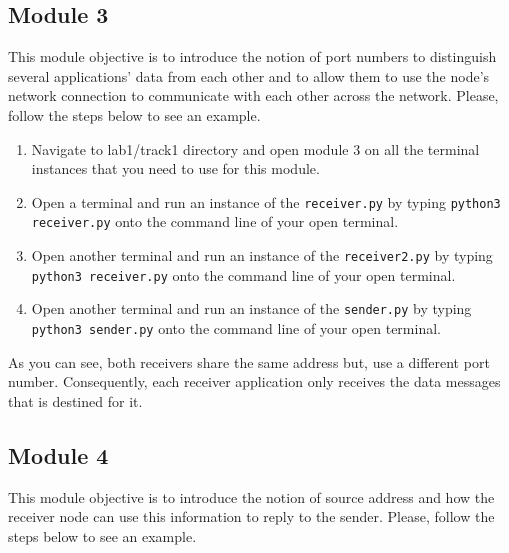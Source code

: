 \documentclass[11pt]{article}
\begin{document}
\subsection{Module 3}
\label{subsec:module3}
This module objective is to introduce the notion of port numbers to distinguish several applications' data from each other and to allow them to use the node's network connection to communicate with each other across the network. Please, follow the steps below to see an example.


\begin{enumerate}
    \item Navigate to lab1/track1 directory and open module 3 on all the terminal instances that you need to use for this module.
    \item Open a terminal and run an instance of the \texttt{receiver.py} by typing \texttt{python3 receiver.py} onto the command line of your open terminal.
    \item Open another terminal and run an instance of the \texttt{receiver2.py} by typing \texttt{python3 receiver.py} onto the command line of your open terminal.
    \item Open another terminal and run an instance of the \texttt{sender.py} by typing \texttt{python3 sender.py} onto the command line of your open terminal.
\end{enumerate}

As you can see, both receivers share the same address but, use a different port number. Consequently, each receiver application only receives the data messages that is destined for it.



\subsection{Module 4}
\label{subsec:module4}
This module objective is to introduce the notion of source address and how the receiver node can use this information to reply to the sender. Please, follow the steps below to see an example.
\end{document}
